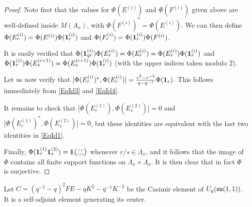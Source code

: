 \begin{proof} Note first that the values for $\Phi(E^{(i)})$ and $\Phi(F^{(i)})$ given above are well-defined inside $M(A_x)$, with $\Phi(F^{(i)})^* = \Phi(E^{(i)})$. We can then define $\Phi(E^{(i)}_r) = \Phi(E^{(i)})\Phi(\mathbf{1}_r^{(i)})$ and $\Phi(F^{(i)}_r) = \Phi(\mathbf{1}_r^{(i)})\Phi(F^{(i)})$. 

It is  easily verified that $\Phi(\mathbf{1}_{qr}^{(i)})\Phi(E^{(i)}_r) = \Phi(E^{(i)}_r) = \Phi(E^{(i)}_r)\Phi(\mathbf{1}_r^{(i)})$ and $\Phi(\mathbf{1}_r^{(i)})\Phi(E^{(i+1)}_s) = \Phi(E^{(i+1)}_s)\Phi(\mathbf{1}_r^{(i)})$ (with the upper indices taken modulo 2).

Let us now verify that $\lbrack \Phi(E^{(i)}_r)^*,\Phi(E^{(i)}_r)\rbrack = \frac{r^2-r^{-2}}{q-q^{-1}}\Phi(\mathbf{1}_r)$. This follows immediately from \eqref{EqId3} and \eqref{EqId4}.

It remains to check that $\lbrack \Phi(E^{(1)}_r),\Phi(E^{(2)}_s)\rbrack = 0$ and $\lbrack \Phi(E^{(1)}_r)^*,\Phi(E^{(2)}_s)\rbrack = 0$, but these identities are equivalent with the last two identities in \eqref{EqId1}.

Finally, $\Phi(\mathbf{1}_r^{(1)}\mathbf{1}_s^{(2)}) = \mathbf{1}{\tiny {\begin{pmatrix} rs\\r/s\end{pmatrix}}}$ whenever $r/s\in \Lambda_x$, and it follows that the image of $\Phi$ contains all finite support functions on $\Lambda_x\times \Lambda_x$. It is then clear that in fact $\Phi$ is surjective. 
\end{proof}

Let $C = (q^{-1}-q)^2FE-qK^2-q^{-1}K^{-2}$ be the Casimir element of $U_q(\mathfrak{su}(1,1))$. It  is a self-adjoint element generating its center. 


